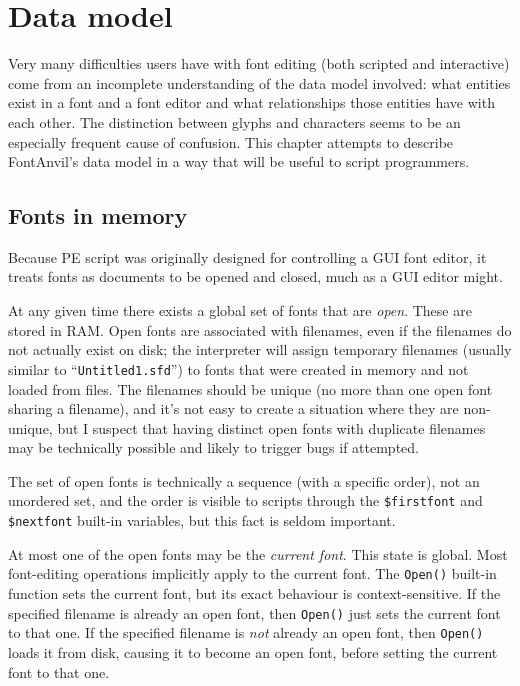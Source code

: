 \chapter{Data model}
\label{sec:data-model}

Very many difficulties users have with font editing (both scripted and
interactive) come from an incomplete understanding of the data model
involved: what entities exist in a font and a font editor and what
relationships those entities have with each other.  The distinction between
glyphs and characters seems to be an especially frequent cause of confusion. 
This chapter attempts to describe FontAnvil's data model in a way that will
be useful to script programmers.

\section{Fonts in memory}

Because PE script was originally designed for controlling a GUI font
editor, it treats fonts as documents to be opened and closed, much as
a GUI editor might.

At any given time there exists a global set of fonts that are \emph{open}. 
These are stored in RAM.  Open fonts are associated with filenames, even if
the filenames do not actually exist on disk; the interpreter will assign
temporary filenames (usually similar to ``\texttt{Untitled1.sfd}'') to fonts
that were created in memory and not loaded from files.  The filenames should
be unique (no more than one open font sharing a filename), and it's not easy
to create a situation where they are non-unique, but I suspect that having
distinct open fonts with duplicate filenames may be technically possible and
likely to trigger bugs if attempted.

The set of open fonts is technically a sequence (with a specific order), not
an unordered set, and the order is visible to scripts through the
\verb|$firstfont| and \verb|$nextfont| built-in variables, but this fact is
seldom important.

At most one of the open fonts may be the \emph{current font}.  This state is
global.  Most font-editing operations implicitly apply to the current font. 
The \texttt{Open()} built-in function sets the current font, but its exact
behaviour is context-sensitive.  If the specified filename is already an
open font, then \texttt{Open()} just sets the current font to that one.  If
the specified filename is \emph{not} already an open font, then
\texttt{Open()} loads it from disk, causing it to become an open font, before
setting the current font to that one.

